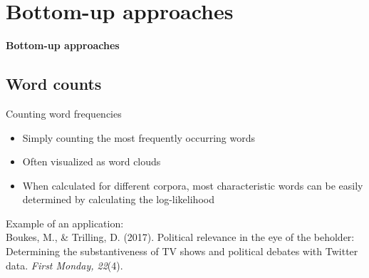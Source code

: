 \documentclass{beamer}
\begin{document}
\section{Bottom-up approaches}

\begin{frame}[plain]
	\textbf{Bottom-up approaches}
\end{frame}


\subsection{Word counts}

\begin{frame}{Counting word frequencies}
	\begin{itemize}
	\item Simply counting the most frequently occurring words
	\item Often visualized as word clouds
	\item When calculated for different corpora, most characteristic words can be easily determined by calculating the log-likelihood
	\end{itemize}


Example of an application: \\
	\tiny
Boukes, M., \& Trilling, D. (2017). Political relevance in the eye of the beholder: Determining the substantiveness of TV shows and political debates with Twitter data. \textit{First Monday, 22}(4). %

\end{frame}


\begin{frame}[plain]
\end{frame}
\end{document}
